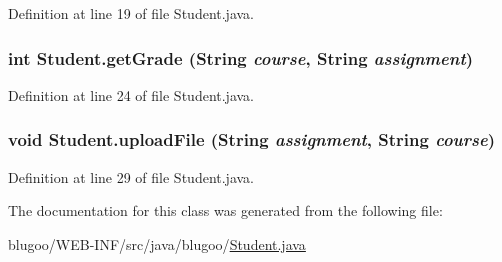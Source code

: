 Definition at line 19 of file Student.java.\hypertarget{classStudent_0442c58d0755dda4022826fc0dc50cf3}{
\subsubsection{\setlength{\rightskip}{0pt plus 5cm}int Student.getGrade (String {\em course}, \/  String {\em assignment})}}
\label{classStudent_0442c58d0755dda4022826fc0dc50cf3}




Definition at line 24 of file Student.java.\hypertarget{classStudent_af9021e3fa44f6a01a57ce1c9b9f92ea}{
\subsubsection{\setlength{\rightskip}{0pt plus 5cm}void Student.uploadFile (String {\em assignment}, \/  String {\em course})}}
\label{classStudent_af9021e3fa44f6a01a57ce1c9b9f92ea}




Definition at line 29 of file Student.java.

The documentation for this class was generated from the following file:\begin{CompactItemize}
\item 
blugoo/WEB-INF/src/java/blugoo/\hyperlink{Student_8java}{Student.java}\end{CompactItemize}
